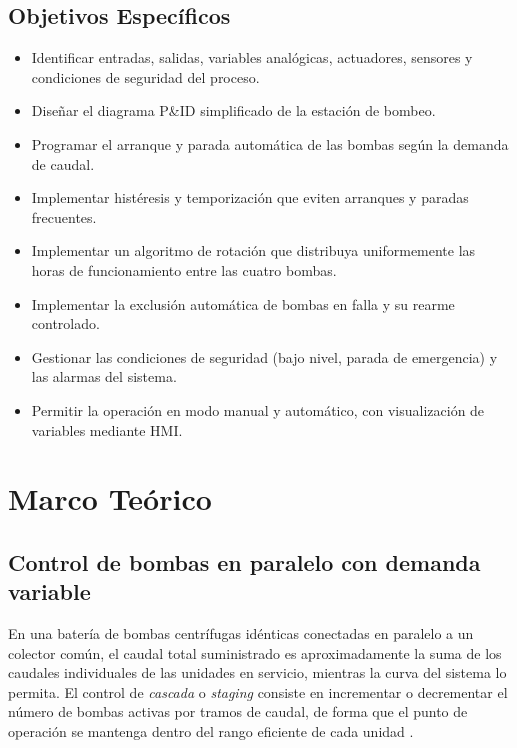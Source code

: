 \documentclass[conference]{IEEEtran}
\begin{document}
\subsection*{Objetivos Específicos}
\begin{itemize}
    \item Identificar entradas, salidas, variables analógicas, actuadores, sensores y condiciones de seguridad del proceso.
    \item Diseñar el diagrama P\&ID simplificado de la estación de bombeo.
    \item Programar el arranque y parada automática de las bombas según la demanda de caudal.
    \item Implementar histéresis y temporización que eviten arranques y paradas frecuentes.
    \item Implementar un algoritmo de rotación que distribuya uniformemente las horas de funcionamiento entre las cuatro bombas.
    \item Implementar la exclusión automática de bombas en falla y su rearme controlado.
    \item Gestionar las condiciones de seguridad (bajo nivel, parada de emergencia) y las alarmas del sistema.
    \item Permitir la operación en modo manual y automático, con visualización de variables mediante HMI.
\end{itemize}

\section{Marco Teórico}

\subsection*{Control de bombas en paralelo con demanda variable}
En una batería de bombas centrífugas idénticas conectadas en paralelo a un colector común, el caudal total suministrado es aproximadamente la suma de los caudales individuales de las unidades en servicio, mientras la curva del sistema lo permita. El control de \emph{cascada} o \emph{staging} consiste en incrementar o decrementar el número de bombas activas por tramos de caudal, de forma que el punto de operación se mantenga dentro del rango eficiente de cada unidad \cite{siemens_s71500}.
\end{document}
